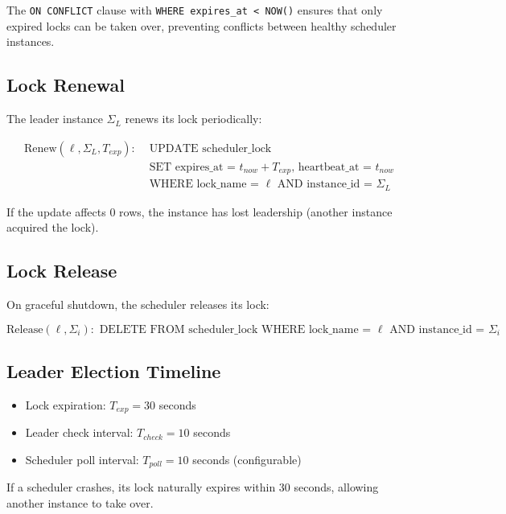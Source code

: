 \documentclass[11pt]{article}
\begin{document}
The \texttt{ON CONFLICT} clause with \texttt{WHERE expires\_at < NOW()} ensures that only expired locks can be taken over, preventing conflicts between healthy scheduler instances.

\subsection{Lock Renewal}

The leader instance $\Sigma_L$ renews its lock periodically:

\begin{equation}
\begin{split}
\text{Renew}(\ell, \Sigma_L, T_{exp}): & \text{ UPDATE scheduler\_lock} \\
& \text{ SET expires\_at = }t_{now} + T_{exp}\text{, heartbeat\_at = }t_{now} \\
& \text{ WHERE lock\_name = }\ell \text{ AND instance\_id = }\Sigma_L
\end{split}
\end{equation}

If the update affects 0 rows, the instance has lost leadership (another instance acquired the lock).

\subsection{Lock Release}

On graceful shutdown, the scheduler releases its lock:

\begin{equation}
\text{Release}(\ell, \Sigma_i): \text{ DELETE FROM scheduler\_lock WHERE lock\_name = }\ell \text{ AND instance\_id = }\Sigma_i
\end{equation}

\subsection{Leader Election Timeline}

\begin{itemize}
\item Lock expiration: $T_{exp} = 30$ seconds
\item Leader check interval: $T_{check} = 10$ seconds
\item Scheduler poll interval: $T_{poll} = 10$ seconds (configurable)
\end{itemize}

If a scheduler crashes, its lock naturally expires within 30 seconds, allowing another instance to take over.
\end{document}
